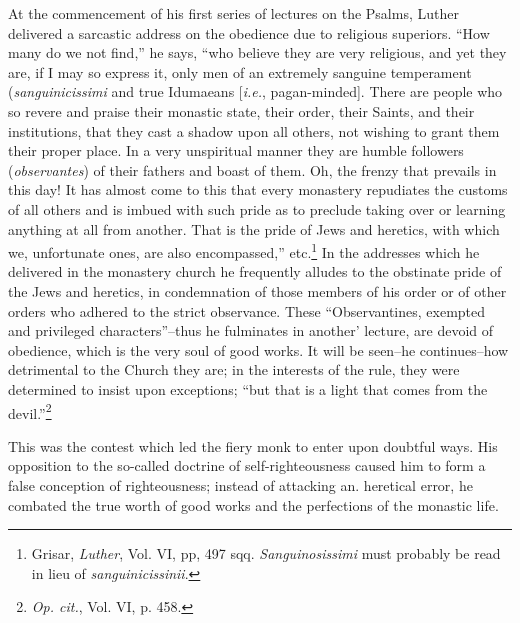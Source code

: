 At the commencement of his first series of lectures on the Psalms, Luther
delivered a sarcastic address on the obedience due to religious superiors.
“How many do we not find,” he says, “who believe they are very religious,
and yet they are, if I may so express it, only men of an extremely
sanguine temperament (\textit{sanguinicissimi} and true Idumaeans [\textit{i.e.}, pagan-minded].
There are people who so revere and praise their monastic
state, their order, their Saints, and their institutions, that they cast a
shadow upon all others, not wishing to grant them their proper place.
In a very unspiritual manner they are humble followers (\textit{observantes}) of their
fathers and boast of them. Oh, the frenzy that prevails in this day! It has
almost come to this that every monastery repudiates the customs of all
others and is imbued with such pride as to preclude taking over or learning
anything at all from another. That is the pride of Jews and heretics,
with which we, unfortunate ones, are also encompassed,” etc.\footnote
{Grisar, \textit{Luther}, Vol. VI, pp, 497 sqq. \textit{Sanguinosissimi} must probably be read in lieu of
\textit{sanguinicissinii}.}
In the
addresses which he delivered in the monastery church he frequently alludes
to the obstinate pride of the Jews and heretics, in condemnation of those
members of his order or of other orders who adhered to the strict
observance. These “Observantines, exempted and privileged characters”--thus he
fulminates in another’ lecture, are devoid of obedience, which is the very
soul of good works. It will be seen--he continues--how detrimental to the
Church they are; in the interests of the rule, they were determined to
insist upon exceptions; “but that is a light that comes from the devil.”\footnote
{\textit{\textit{Op. cit.}}, Vol. VI, p. 458.}

This was the contest which led the fiery monk to enter upon
doubtful ways. His opposition to the so-called doctrine of self-righteousness caused him to form a false conception of righteousness;
instead of attacking an. heretical error, he combated the true worth
of good works and the perfections of the monastic life.

